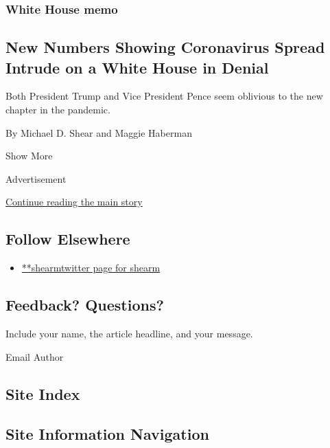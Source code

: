 \begin{enumerate}
  \hypertarget{white-house-memo}{%
  \subsubsection{White House memo}\label{white-house-memo}}

  \hypertarget{new-numbers-showing-coronavirus-spread-intrude-on-a-white-house-in-denial}{%
  \subsection{New Numbers Showing Coronavirus Spread Intrude on a White
  House in
  Denial}\label{new-numbers-showing-coronavirus-spread-intrude-on-a-white-house-in-denial}}

  Both President Trump and Vice President Pence seem oblivious to the
  new chapter in the pandemic.

  By Michael D. Shear and Maggie Haberman
\end{enumerate}

Show More

Advertisement

\protect\hyperlink{after-mid2}{Continue reading the main story}

\hypertarget{follow-elsewhere}{%
\subsection{Follow Elsewhere}\label{follow-elsewhere}}

\begin{itemize}
\tightlist
\item
  \href{https://twitter.com/shearm}{**shearmtwitter page for shearm}
\end{itemize}

\hypertarget{feedback-questions}{%
\subsection{Feedback? Questions?}\label{feedback-questions}}

Include your name, the article headline, and your message.

Email Author

\hypertarget{site-index}{%
\subsection{Site Index}\label{site-index}}

\hypertarget{site-information-navigation}{%
\subsection{Site Information
Navigation}\label{site-information-navigation}}

